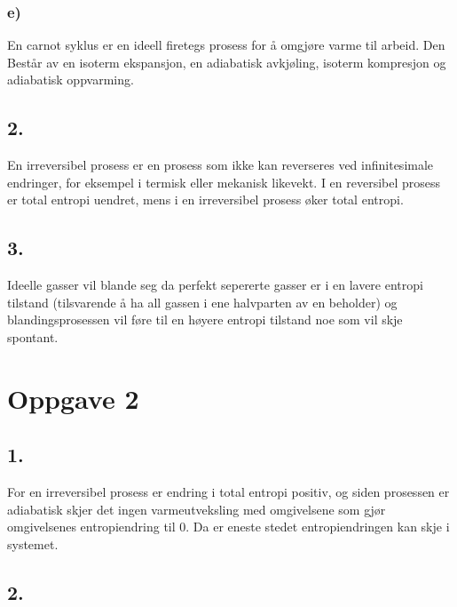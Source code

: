 \subsubsection*{e)}

En carnot syklus er en ideell firetegs prosess for å omgjøre varme til arbeid. Den Består av en isoterm ekspansjon, en adiabatisk avkjøling, isoterm kompresjon og adiabatisk oppvarming.


\subsection*{2.}

En irreversibel prosess er en prosess som ikke kan reverseres ved infinitesimale endringer, for eksempel i termisk eller mekanisk likevekt. I en reversibel prosess er total entropi uendret, mens i en irreversibel prosess øker total entropi.


\subsection*{3.}

Ideelle gasser vil blande seg da perfekt sepererte gasser er i en lavere entropi tilstand (tilsvarende å ha all gassen i ene halvparten av en beholder) og blandingsprosessen vil føre til en høyere entropi tilstand noe som vil skje spontant.


\section*{Oppgave 2}

\subsection*{1.}

For en irreversibel prosess er endring i total entropi positiv, og siden prosessen er adiabatisk skjer det ingen varmeutveksling med omgivelsene som gjør omgivelsenes entropiendring til 0. Da er eneste stedet entropiendringen kan skje i systemet.

\subsection*{2.}

